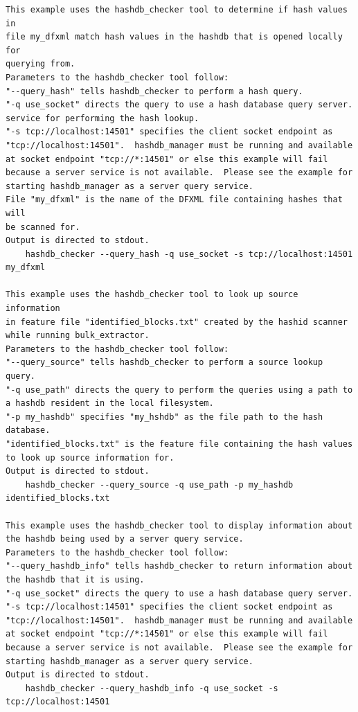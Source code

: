 \documentclass[11pt,twoside]{article}
\begin{document}
\begin{small}
\begin{verbatim}
This example uses the hashdb_checker tool to determine if hash values in
file my_dfxml match hash values in the hashdb that is opened locally for
querying from.
Parameters to the hashdb_checker tool follow:
"--query_hash" tells hashdb_checker to perform a hash query.
"-q use_socket" directs the query to use a hash database query server.
service for performing the hash lookup.
"-s tcp://localhost:14501" specifies the client socket endpoint as
"tcp://localhost:14501".  hashdb_manager must be running and available
at socket endpoint "tcp://*:14501" or else this example will fail
because a server service is not available.  Please see the example for
starting hashdb_manager as a server query service.
File "my_dfxml" is the name of the DFXML file containing hashes that will
be scanned for.
Output is directed to stdout.
    hashdb_checker --query_hash -q use_socket -s tcp://localhost:14501 my_dfxml

This example uses the hashdb_checker tool to look up source information
in feature file "identified_blocks.txt" created by the hashid scanner
while running bulk_extractor.
Parameters to the hashdb_checker tool follow:
"--query_source" tells hashdb_checker to perform a source lookup query.
"-q use_path" directs the query to perform the queries using a path to
a hashdb resident in the local filesystem.
"-p my_hashdb" specifies "my_hshdb" as the file path to the hash database.
"identified_blocks.txt" is the feature file containing the hash values
to look up source information for.
Output is directed to stdout.
    hashdb_checker --query_source -q use_path -p my_hashdb identified_blocks.txt

This example uses the hashdb_checker tool to display information about
the hashdb being used by a server query service.
Parameters to the hashdb_checker tool follow:
"--query_hashdb_info" tells hashdb_checker to return information about
the hashdb that it is using.
"-q use_socket" directs the query to use a hash database query server.
"-s tcp://localhost:14501" specifies the client socket endpoint as
"tcp://localhost:14501".  hashdb_manager must be running and available
at socket endpoint "tcp://*:14501" or else this example will fail
because a server service is not available.  Please see the example for
starting hashdb_manager as a server query service.
Output is directed to stdout.
    hashdb_checker --query_hashdb_info -q use_socket -s tcp://localhost:14501
\end{verbatim}
\end{small}
\end{document}
